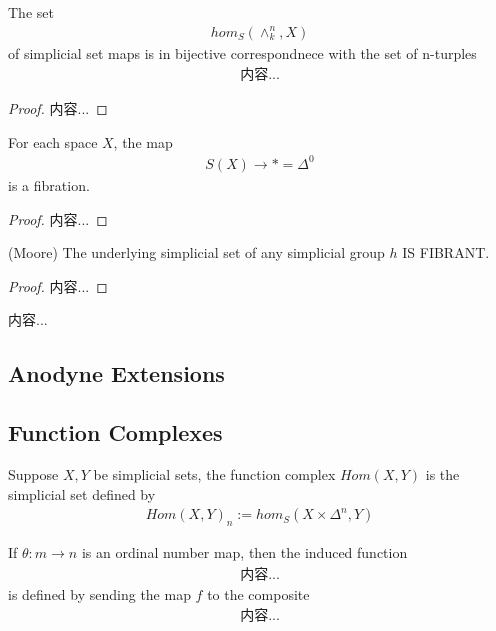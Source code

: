 \documentclass[Total.tex]{subfiles}
\begin{document}
				
				\begin{corollary}
					The set
					\begin{gather*}
						hom_S(\wedge^n_k,X)
					\end{gather*}
					of simplicial set maps is in bijective correspondnece with the set of n-turples
					\begin{gather*}
						内容...
					\end{gather*}
				\end{corollary}
				\begin{proof}
					内容...
				\end{proof}
				
				\begin{lemma}
					For each space $X$, the map
					\begin{gather*}
						S(X)\rightarrow *=\Delta^0
					\end{gather*}
					is a fibration.
				\end{lemma}
				\begin{proof}
					内容...
				\end{proof}
				
				\begin{lemma}
					(Moore) The underlying simplicial set of any simplicial group $h$ IS FIBRANT.
				\end{lemma}
				\begin{proof}
					内容...
				\end{proof}
				
				\begin{lemma}
					内容...
				\end{lemma}
			\subsection{Anodyne Extensions}
			\subsection{Function Complexes}
				\begin{Def}
					Suppose $X,Y$ be simplicial sets, the function complex $Hom(X,Y)$ is the simplicial set defined by
					\begin{gather*}
						Hom(X,Y)_n:=hom_S(X\times \Delta^n,Y)
					\end{gather*}
					
					If $\theta:m\rightarrow n$ is an ordinal number map, then the induced function
					\begin{gather*}
						内容...
					\end{gather*}
					is defined by sending the map $f$ to the composite
					\begin{gather*}
						内容...
					\end{gather*}
				\end{Def}
\end{document}
